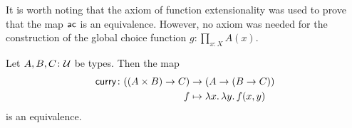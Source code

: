 \begin{rem}
    It is worth noting that the axiom of function extensionality was used to prove that the map $\mathsf{ac}$ is an equivalence. However, no axiom was needed for the construction of the global choice function $g\colon\prod_{x\colon X}A(x)$.
\end{rem}

\begin{thm}\fe
    Let\/ $A,B,C\colon\univ$ be types. Then the map
    \begin{align*}
        \fun{curry}\colon((A\times B)\to C)&\to(A\to(B\to C))\\
        f&\mapsto\lambda x.\,\lambda y.\,f(x,y)
    \end{align*}
    is an equivalence.
\end{thm}

